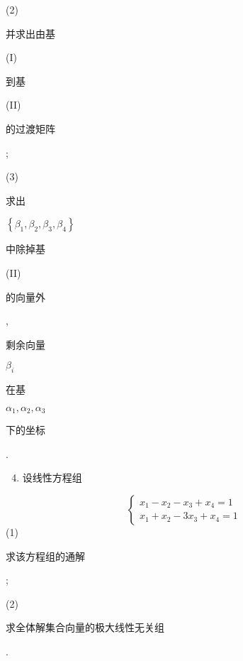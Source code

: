 \documentclass[10pt]{article}
\begin{document}
(2) \begin{CJK}{UTF8}{mj}并求出由基\end{CJK} (I) \begin{CJK}{UTF8}{mj}到基\end{CJK} (II) \begin{CJK}{UTF8}{mj}的过渡矩阵\end{CJK};

(3) \begin{CJK}{UTF8}{mj}求出\end{CJK} $\left\{\beta_{1}, \beta_{2}, \beta_{3}, \beta_{4}\right\}$ \begin{CJK}{UTF8}{mj}中除掉基\end{CJK} (II) \begin{CJK}{UTF8}{mj}的向量外\end{CJK}, \begin{CJK}{UTF8}{mj}剩余向量\end{CJK} $\beta_{i}$ \begin{CJK}{UTF8}{mj}在基\end{CJK} $\alpha_{1}, \alpha_{2}, \alpha_{3}$ \begin{CJK}{UTF8}{mj}下的坐标\end{CJK}.

\begin{enumerate}
  \setcounter{enumi}{3}
  \item \begin{CJK}{UTF8}{mj}设线性方程组\end{CJK}
\end{enumerate}
$$
\left\{\begin{array}{l}
x_{1}-x_{2}-x_{3}+x_{4}=1 \\
x_{1}+x_{2}-3 x_{3}+x_{4}=1
\end{array}\right.
$$
(1) \begin{CJK}{UTF8}{mj}求该方程组的通解\end{CJK};

(2) \begin{CJK}{UTF8}{mj}求全体解集合向量的极大线性无关组\end{CJK}.
\end{document}
